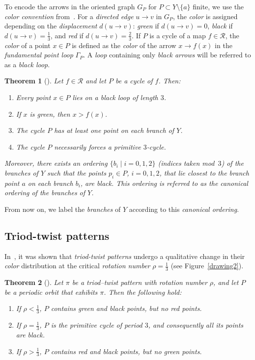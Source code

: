 \documentclass[12pt,reqno]{amsart}
\newtheorem{theorem}{Theorem}[section]
\theoremstyle{definition}
\theoremstyle{remark}
\theoremstyle{assumption}
\numberwithin{equation}{section}
\begin{document}
	To encode the arrows in the oriented graph $G_P$ for $P \subset Y \setminus \{a\}$ finite, we use the \emph{color convention} from~\cite{BMR}.  
	For a \emph{directed edge} $u \to v$ in $G_P$, the \emph{color} is assigned depending on the \emph{displacement} $d(u \to v)$:  
	\emph{green} if $d(u \to v)=0$, \emph{black} if $d(u \to v)=\tfrac{1}{3}$, and \emph{red} if $d(u \to v)=\tfrac{2}{3}$.  
	If $P$ is a cycle of a map $f \in \mathcal{R}$, the \emph{color} of a point $x \in P$ is defined as the \emph{color} of the arrow $x \to f(x)$ in the \emph{fundamental point loop} $\Gamma_P$.  
	A \emph{loop} containing only \emph{black arrows} will be referred to as a \emph{black loop}.
	
	\begin{theorem}[\cite{BMR}]\label{black:loop:length:3}
		Let $f \in \mathcal{R}$ and let $P$ be a cycle of $f$. Then:
		\begin{enumerate}
			\item Every point $x \in P$ lies on a black loop of length $3$.
			\item If $x$ is green, then $x > f(x)$.
			\item The cycle $P$ has at least one point on each branch of $Y$.
			\item The cycle $P$ necessarily forces a primitive $3$-cycle.
		\end{enumerate}
		Moreover, there exists an ordering $\{b_i \mid i=0,1,2\}$ (indices taken mod~$3$) of the branches of $Y$ such that the points $p_i \in P$, $i=0,1,2$, that lie closest to the branch point $a$ on each branch $b_i$, are black.  
		This ordering is referred to as the canonical ordering of the branches of $Y$.
	\end{theorem}
	
	From now on, we label the \emph{branches} of $Y$ according to this \emph{canonical ordering}.
	


\subsection{Triod-twist patterns}

In~\cite{BB5}, it was shown that \emph{triod-twist patterns} undergo a qualitative change in their \emph{color} distribution at the critical \emph{rotation number} $\rho = \tfrac{1}{3}$ (see Figure~\ref{drawing2}).

 \begin{theorem}[\cite{BB5}]\label{bifurcation:one:third}
 	Let $\pi$ be a triod--twist pattern with rotation number $\rho$, and let $P$ be a periodic orbit that exhibits $\pi$. Then the following hold:
 	\begin{enumerate}
 		\item If $\rho < \tfrac{1}{3}$, $P$ contains green and black points, but no red points.
 		\item If $\rho = \tfrac{1}{3}$, $P$ is the primitive cycle of period $3$, and consequently all its points are black.
 		\item If $\rho > \tfrac{1}{3}$, $P$ contains red and black points, but no green points.
 	\end{enumerate}
 \end{theorem}
\end{document}
